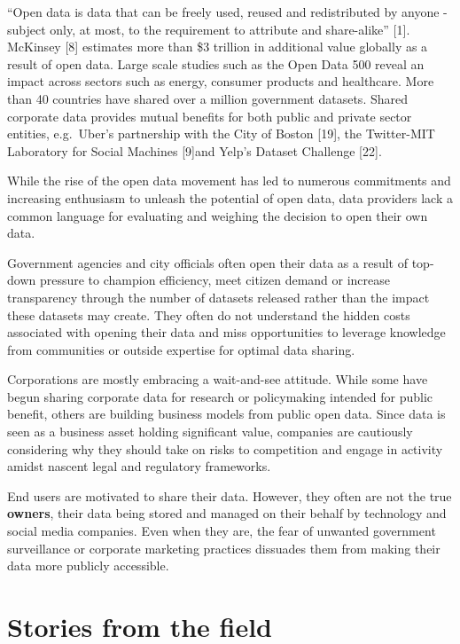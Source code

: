 \documentclass[]{acm_proc_article-sp}
\begin{document}
``Open data is data that can be freely used, reused and redistributed by
anyone - subject only, at most, to the requirement to attribute and
share-alike'' {[}1{]}. McKinsey {[}8{]} estimates more than \$3 trillion
in additional value globally as a result of open data. Large scale
studies such as the Open Data 500 reveal an impact across sectors such
as energy, consumer products and healthcare. More than 40 countries have
shared over a million government datasets. Shared corporate data
provides mutual benefits for both public and private sector entities,
e.g.~Uber's partnership with the City of Boston {[}19{]}, the
Twitter-MIT Laboratory for Social Machines {[}9{]}and Yelp's Dataset
Challenge {[}22{]}.

While the rise of the open data movement has led to numerous commitments
and increasing enthusiasm to unleash the potential of open data, data
providers lack a common language for evaluating and weighing the
decision to open their own data.

Government agencies and city officials often open their data as a result
of top-down pressure to champion efficiency, meet citizen demand or
increase transparency through the number of datasets released rather
than the impact these datasets may create. They often do not understand
the hidden costs associated with opening their data and miss
opportunities to leverage knowledge from communities or outside
expertise for optimal data sharing.

Corporations are mostly embracing a wait-and-see attitude. While some
have begun sharing corporate data for research or policymaking intended
for public benefit, others are building business models from public open
data. Since data is seen as a business asset holding significant value,
companies are cautiously considering why they should take on risks to
competition and engage in activity amidst nascent legal and regulatory
frameworks.

End users are motivated to share their data. However, they often are not
the true \textbf{owners}, their data being stored and managed on their
behalf by technology and social media companies. Even when they are, the
fear of unwanted government surveillance or corporate marketing
practices dissuades them from making their data more publicly
accessible.

\section{Stories from the field}\label{stories-from-the-field}
\end{document}
